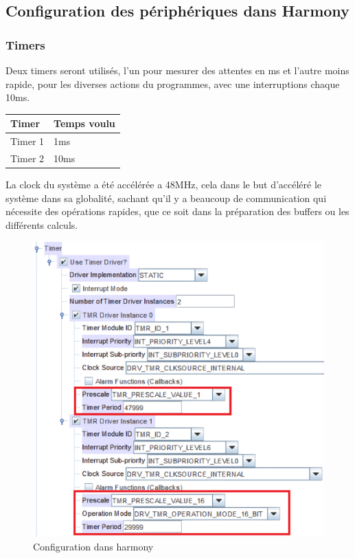 \subsection{Configuration des périphériques dans Harmony}
{
	\subsubsection{Timers} 
	
	Deux timers seront utilisés, l'un pour mesurer des attentes en ms et l'autre moins rapide, pour les diverses actions du programmes, avec une interruptions chaque 10ms.
	\begin{table}[h]
		\centering
		\begin{tabular}{|l|l|}
			\hline
			Timer & Temps voulu \\
			\hline
			Timer 1 & 1ms \\
			\hline
			Timer 2 & 10ms \\
			\hline
		\end{tabular}
	\end{table}

	La clock du système a été accélérée a 48MHz, cela dans le but d'accéléré le système dans sa globalité, sachant qu'il y a beaucoup de communication qui nécessite des opérations rapides, que ce soit dans la préparation des buffers ou les différents calculs.
	
	\begin{figure}[h]
		\centering
		\includegraphics[width=0.55\linewidth]{Figures/Dev-SOFT/Timer_config}
		\caption{Configuration dans harmony}
		\label{fig:timerconfig}
	\end{figure}

}
